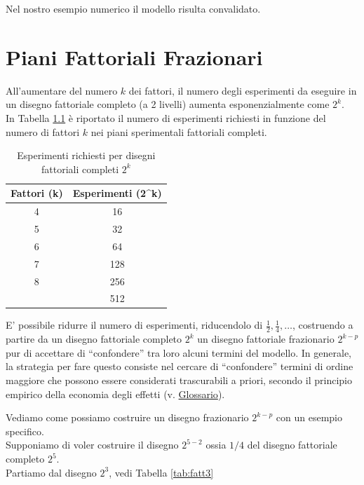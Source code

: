 \documentclass[
  11pt,
]{book}
\begin{document}
Nel nostro esempio numerico il modello risulta convalidato.

\hypertarget{piani-fattoriali-frazionari}{%
\chapter{Piani Fattoriali Frazionari}\label{piani-fattoriali-frazionari}}

All'aumentare del numero \(k\) dei fattori, il numero degli esperimenti da eseguire in un disegno fattoriale completo (a 2 livelli) aumenta esponenzialmente come \(2^k\).\\
In Tabella \ref{tab:exprich} è riportato il numero di esperimenti richiesti in funzione del numero di fattori \(k\) nei piani sperimentali fattoriali completi.

\begin{table}

\caption{\label{tab:exprich}Esperimenti richiesti per disegni fattoriali completi $2^k$}
\centering
\begin{tabular}[t]{cc}
\toprule
Fattori (k) & Esperimenti (2\textasciicircum{}k)\\
\midrule
4 & 16\\
5 & 32\\
6 & 64\\
7 & 128\\
8 & 256\\
\addlinespace
9 & 512\\
\bottomrule
\end{tabular}
\end{table}

E' possibile ridurre il numero di esperimenti, riducendolo di \(\frac{1}{2},\frac{1}{4}, \dots\), costruendo a partire da un disegno fattoriale completo \(2^k\) un disegno fattoriale frazionario \(2^{k-p}\) pur di accettare di ``confondere'' tra loro alcuni termini del modello. In generale, la strategia per fare questo consiste nel cercare di ``confondere'' termini di ordine maggiore che possono essere considerati trascurabili a priori, secondo il principio empirico della economia degli effetti (v. \protect\hyperlink{glossario}{Glossario}).

Vediamo come possiamo costruire un disegno frazionario \(2^{k-p}\) con un esempio specifico.\\
Supponiamo di voler costruire il disegno \(2^{5-2}\) ossia \(1/4\) del disegno fattoriale completo \(2^5\).\\
Partiamo dal disegno \(2^3\), vedi Tabella \ref{tab:fatt3}
\end{document}
